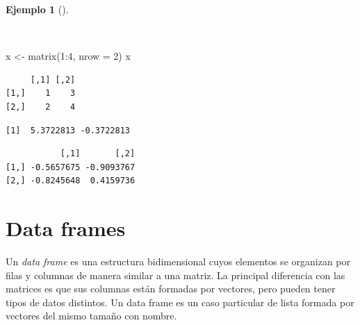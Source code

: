 \documentclass[
  a4paper,
]{scrreport}
\newenvironment{Shaded}{\begin{snugshade}}{\end{snugshade}}
\newcommand{\AttributeTok}[1]{\textcolor[rgb]{0.40,0.45,0.13}{#1}}
\newcommand{\CommentTok}[1]{\textcolor[rgb]{0.37,0.37,0.37}{#1}}
\newcommand{\DecValTok}[1]{\textcolor[rgb]{0.68,0.00,0.00}{#1}}
\newcommand{\FunctionTok}[1]{\textcolor[rgb]{0.28,0.35,0.67}{#1}}
\newcommand{\NormalTok}[1]{\textcolor[rgb]{0.00,0.23,0.31}{#1}}
\newcommand{\OtherTok}[1]{\textcolor[rgb]{0.00,0.23,0.31}{#1}}
\newcommand{\SpecialCharTok}[1]{\textcolor[rgb]{0.37,0.37,0.37}{#1}}
\theoremstyle{definition}
\theoremstyle{definition}
\newtheorem{example}{Ejemplo}[chapter]
\theoremstyle{remark}
\begin{document}
\begin{example}[]\protect\hypertarget{exm-autovalores-autovectores}{}\label{exm-autovalores-autovectores}

~

\begin{Shaded}
\begin{Highlighting}[]
\NormalTok{x }\OtherTok{\textless{}{-}} \FunctionTok{matrix}\NormalTok{(}\DecValTok{1}\SpecialCharTok{:}\DecValTok{4}\NormalTok{, }\AttributeTok{nrow =} \DecValTok{2}\NormalTok{)}
\NormalTok{x}
\end{Highlighting}
\end{Shaded}

\begin{verbatim}
     [,1] [,2]
[1,]    1    3
[2,]    2    4
\end{verbatim}

\begin{Shaded}
\end{Shaded}

\begin{verbatim}
[1]  5.3722813 -0.3722813
\end{verbatim}

\begin{Shaded}
\end{Shaded}

\begin{verbatim}
           [,1]       [,2]
[1,] -0.5657675 -0.9093767
[2,] -0.8245648  0.4159736
\end{verbatim}

\end{example}

\hypertarget{data-frames}{%
\section{Data frames}\label{data-frames}}

Un \emph{data frame} es una estructura bidimensional cuyos elementos se
organizan por filas y columnas de manera similar a una matriz. La
principal diferencia con las matrices es que sus columnas están formadas
por vectores, pero pueden tener tipos de datos distintos. Un data frame
es un caso particular de lista formada por vectores del mismo tamaño con
nombre.
\end{document}
